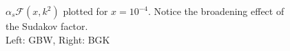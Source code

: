 \documentclass[11pt]{article}
\begin{document}
\begin{figure}[t]
\caption{$\alpha_s\mathcal{F}(x,k^2)$ plotted for $x=10^{-4}$. Notice the broadening effect of the Sudakov factor.\\Left: GBW, Right: BGK}
\label{fig:gluon}
\end{figure}
\end{document}

